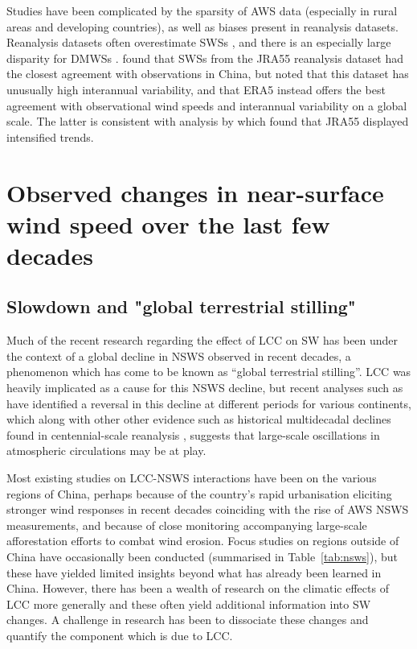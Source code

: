 Studies have been complicated by the sparsity of \ac{AWS} data (especially in rural areas and developing countries), as well as biases present in reanalysis datasets. Reanalysis datasets often overestimate \acp{SWS} \citep{fan2021}, and there is an especially large disparity for \acp{DMWS} \citep{zhang2020, zhang2022}. \citet{zhang2019} found that \acp{SWS} from the \ac{JRA55} reanalysis dataset had the closest agreement with observations in China, but \citet{ramon2019} noted that this dataset has unusually high interannual variability, and that \ac{ERA5} instead offers the best agreement with observational wind speeds and interannual variability on a global scale. The latter is consistent with analysis by \citet{torralba2017} which found that \ac{JRA55} displayed intensified trends.

\section[Recent trends in near-surface wind speed]{Observed changes in near-surface wind speed over the last few decades}

\subsection{Slowdown and "global terrestrial stilling"}

Much of the recent research regarding the effect of \ac{LCC} on \ac{SW} has been under the context of a global decline in \ac{NSWS} observed in recent decades, a phenomenon which has come to be known as “global terrestrial stilling”. \ac{LCC} was heavily implicated as a cause for this \ac{NSWS} decline, but recent analyses such as \citep{zeng2019} have identified a reversal in this decline at different periods for various continents, which along with other other evidence such as historical multidecadal declines found in centennial-scale reanalysis \citep{shen2021}, suggests that large-scale oscillations in atmospheric circulations may be at play.

Most existing studies on \ac{LCC}-\ac{NSWS} interactions have been on the various regions of China, perhaps because of the country’s rapid urbanisation eliciting stronger wind responses in recent decades coinciding with the rise of \ac{AWS} \ac{NSWS} measurements, and because of close monitoring accompanying large-scale afforestation efforts to combat wind erosion. Focus studies on regions outside of China have occasionally been conducted (summarised in Table~\ref{tab:nsws}), but these have yielded limited insights beyond what has already been learned in China. However, there has been a wealth of research on the climatic effects of \ac{LCC} more generally and these often yield additional information into \ac{SW} changes. A challenge in research has been to dissociate these changes and quantify the component which is due to \ac{LCC}.

